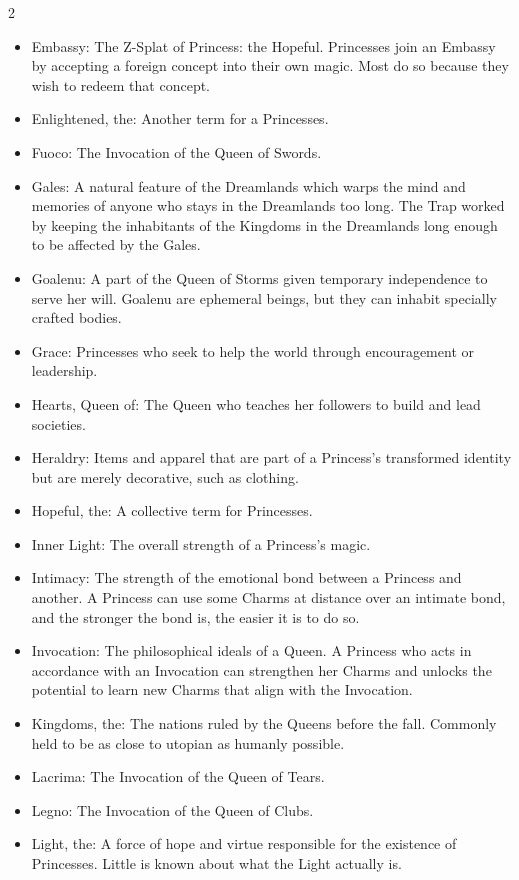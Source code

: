 \begin{multicols}{2}
\begin{itemize}
  \item Embassy: The Z-Splat of Princess: the Hopeful. Princesses join an Embassy by accepting a foreign concept into their own magic. Most do so because they wish to redeem that concept. 
  \item Enlightened, the: Another term for a Princesses. 
  \item Fuoco: The Invocation of the Queen of Swords.
  \item Gales: A natural feature of the Dreamlands which warps the mind and memories of anyone who stays in the Dreamlands too long. The Trap worked by keeping the inhabitants of the Kingdoms in the Dreamlands long enough to be affected by the Gales. 
  \item Goalenu: A part of the Queen of Storms given temporary independence to serve her will. Goalenu are ephemeral beings, but they can inhabit specially crafted bodies. 
  \item Grace: Princesses who seek to help the world through encouragement or leadership. 
  \item Hearts, Queen of: The Queen who teaches her followers to build and lead societies.
  \item Heraldry: Items and apparel that are part of a Princess's transformed identity but are merely decorative, such as clothing. 
  \item Hopeful, the: A collective term for Princesses. 
  \item Inner Light: The overall strength of a Princess's magic. 
  \item Intimacy: The strength of the emotional bond between a Princess and another. A Princess can use some Charms at distance over an intimate bond, and the stronger the bond is, the easier it is to do so. 
  \item Invocation: The philosophical ideals of a Queen. A Princess who acts in accordance with an Invocation can strengthen her Charms and unlocks the potential to learn new Charms that align with the Invocation. 
  \item Kingdoms, the: The nations ruled by the Queens before the fall. Commonly held to be as close to utopian as humanly possible.
  \item Lacrima: The Invocation of the Queen of Tears.
  \item Legno: The Invocation of the Queen of Clubs.
  \item Light, the: A force of hope and virtue responsible for the existence of Princesses. Little is known about what the Light actually is.

\end{itemize}
\end{multicols}

